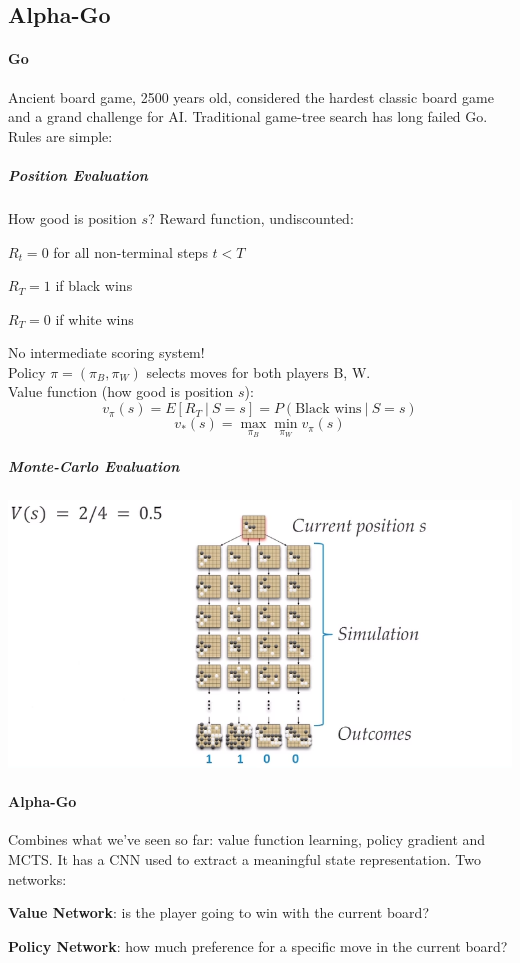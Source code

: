 \documentclass[10pt]{report}
\begin{document}
\subsection{Alpha-Go}
\paragraph{Go} Ancient board game, 2500 years old, considered the hardest classic board game and a grand challenge for AI. Traditional game-tree search has long failed Go.\\
Rules are simple:
\begin{list}{}{}
	\item %
\end{list}
\subparagraph{Position Evaluation} How good is position $s$? Reward function, undiscounted:
\begin{list}{}{}
	\item $R_t = 0$ for all non-terminal steps $t<T$
	\item $R_T = 1$ if black wins
	\item $R_T = 0$ if white wins
\end{list}
No intermediate scoring system!\\
Policy $\pi=(\pi_B,\pi_W)$ selects moves for both players B, W.\\
Value function (how good is position $s$):
$$v_\pi(s) = E[R_T\:|\:S=s] = P(\text{Black wins}\:|\:S=s)$$
$$v_*(s) = \max_{\pi_B}\min_{\pi_W} v_\pi(s)$$
\subparagraph{Monte-Carlo Evaluation}
\begin{center}
	\includegraphics[scale=0.5]{187.png} %
\end{center}
\paragraph{Alpha-Go} Combines what we've seen so far: value function learning, policy gradient and MCTS. It has a CNN used to extract a meaningful state representation.
Two networks:
\begin{list}{}{} %
	\item \textbf{Value Network}: is the player going to win with the current board?
	\item \textbf{Policy Network}: how much preference for a specific move in the current board?
\end{list}
\end{document}
